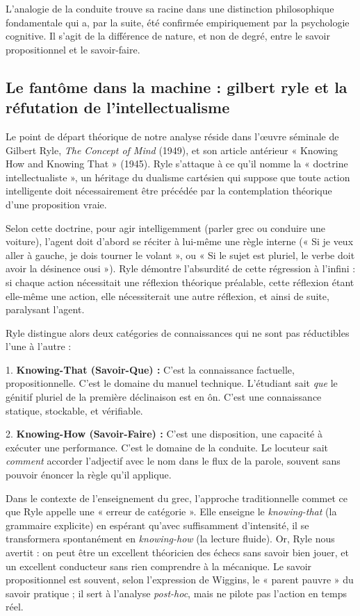 L'analogie de la conduite trouve sa racine dans une distinction philosophique fondamentale qui a,
par la suite, été confirmée empiriquement par la psychologie cognitive. Il s'agit de la différence
de nature, et non de degré, entre le savoir propositionnel et le savoir-faire.



\subsection{Le fantôme dans la machine : gilbert ryle et la réfutation de l'intellectualisme}

Le point de départ théorique de notre analyse réside dans l'œuvre séminale de Gilbert Ryle,
\textit{The Concept of Mind} (1949), et son article antérieur « Knowing How and Knowing That »
(1945). Ryle s'attaque à ce qu'il nomme la « doctrine intellectualiste », un héritage du dualisme
cartésien qui suppose que toute action intelligente doit nécessairement être précédée par la
contemplation théorique d'une proposition vraie.\cite{III-3-3-ref1}

Selon cette doctrine, pour agir intelligemment (parler grec ou conduire une voiture), l'agent doit
d'abord se réciter à lui-même une règle interne (« Si je veux aller à gauche, je dois tourner le
volant », ou « Si le sujet est pluriel, le verbe doit avoir la désinence \-ousi »). Ryle démontre
l'absurdité de cette régression à l'infini : si chaque action nécessitait une réflexion théorique
préalable, cette réflexion étant elle-même une action, elle nécessiterait une autre réflexion, et
ainsi de suite, paralysant l'agent.\cite{III-3-3-ref2}

Ryle distingue alors deux catégories de connaissances qui ne sont pas réductibles l'une à l'autre :

1. \textbf{Knowing-That (Savoir-Que) :} C'est la connaissance factuelle, propositionnelle. C'est le
domaine du manuel technique. L'étudiant sait \textit{que} le génitif pluriel de la première
déclinaison est en \-ôn. C'est une connaissance statique, stockable, et vérifiable.

2. \textbf{Knowing-How (Savoir-Faire) :} C'est une disposition, une capacité à exécuter une
performance. C'est le domaine de la conduite. Le locuteur sait \textit{comment} accorder l'adjectif
avec le nom dans le flux de la parole, souvent sans pouvoir énoncer la règle qu'il
applique.\cite{III-3-3-ref1}

Dans le contexte de l'enseignement du grec, l'approche traditionnelle commet ce que Ryle appelle une
« erreur de catégorie ».\cite{III-3-3-ref2} Elle enseigne le \textit{knowing-that} (la grammaire
explicite) en espérant qu'avec suffisamment d'intensité, il se transformera spontanément en
\textit{knowing-how} (la lecture fluide). Or, Ryle nous avertit : on peut être un excellent
théoricien des échecs sans savoir bien jouer, et un excellent conducteur sans rien comprendre à la
mécanique.\cite{III-3-3-ref3} Le savoir propositionnel est souvent, selon l'expression de Wiggins,
le « parent pauvre » du savoir pratique ; il sert à l'analyse \textit{post-hoc}, mais ne pilote pas
l'action en temps réel.



